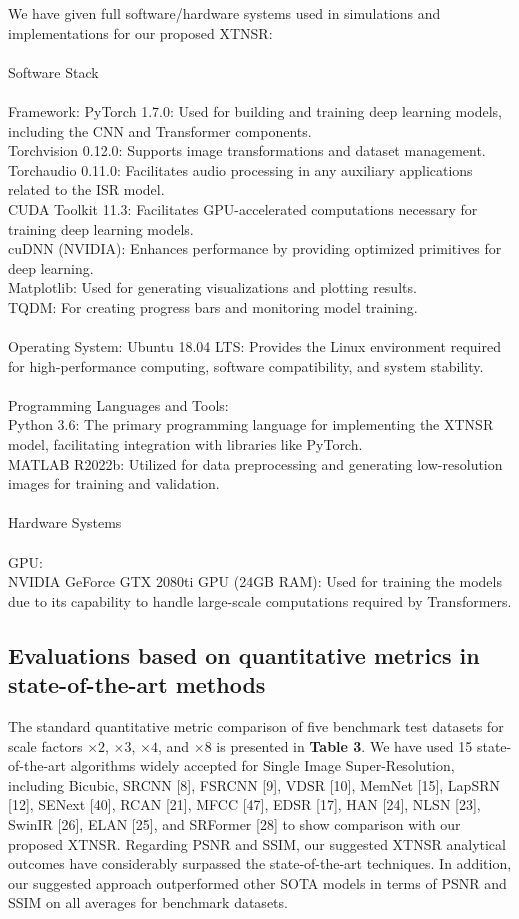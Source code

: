 \documentclass[twocolumn]{svjour3}          %
\begin{document}
We have given full software/hardware systems used in simulations and implementations for our proposed XTNSR:\\
\\
Software Stack\\
\\
Framework:
PyTorch 1.7.0: Used for building and training deep learning models, including the CNN and Transformer components.\\
Torchvision 0.12.0: Supports image transformations and dataset management.\\
Torchaudio 0.11.0: Facilitates audio processing in any auxiliary applications related to the ISR model.\\
CUDA Toolkit 11.3: Facilitates GPU-accelerated computations necessary for training deep learning models.\\
cuDNN (NVIDIA): Enhances performance by providing optimized primitives for deep learning.\\
Matplotlib: Used for generating visualizations and plotting results.\\
TQDM: For creating progress bars and monitoring model training.\\
\\
Operating System:
Ubuntu 18.04 LTS: Provides the Linux environment required for high-performance computing, software compatibility, and system stability.\\
\\
Programming Languages and Tools:\\
Python 3.6: The primary programming language for implementing the XTNSR model, facilitating integration with libraries like PyTorch.\\
MATLAB R2022b: Utilized for data preprocessing and generating low-resolution images for training and validation.\\
\\
Hardware Systems\\
\\
GPU:\\
NVIDIA GeForce GTX 2080ti GPU (24GB RAM): Used for training the models due to its capability to handle large-scale computations required by Transformers.\\

\subsection{Evaluations based on quantitative metrics in state-of-the-art methods}
The standard quantitative metric comparison of five benchmark test datasets for scale factors $\times2$, $\times3$, $\times4$, and $\times8$  is presented in \textbf{Table 3}. We have used 15 state-of-the-art algorithms widely accepted for Single Image Super-Resolution, including Bicubic, SRCNN [8], FSRCNN [9], VDSR [10], MemNet [15], LapSRN [12], SENext [40], RCAN [21], MFCC [47], EDSR [17], HAN [24], NLSN [23], SwinIR [26], ELAN [25], and SRFormer [28] to show comparison with our proposed XTNSR. Regarding  PSNR and SSIM, our suggested XTNSR analytical outcomes have considerably surpassed the state-of-the-art techniques. In addition, our suggested approach outperformed other SOTA models in terms of PSNR and SSIM on all averages for benchmark datasets.
\end{document}
